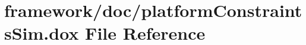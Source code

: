 \hypertarget{platform_constraints_sim_8dox}{}\section{framework/doc/platform\+Constraints\+Sim.dox File Reference}
\label{platform_constraints_sim_8dox}
